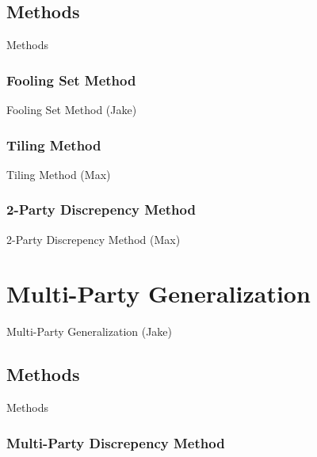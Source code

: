 \documentclass{beamer}
\begin{document}
\subsection{Methods}

\begin{frame}{Methods}
\TODO
\tableofcontents[currentsection]
\end{frame}

\subsubsection{Fooling Set Method}

\begin{frame}{Fooling Set Method (Jake)}
\TODO
\end{frame}

\subsubsection{Tiling Method}

\begin{frame}{Tiling Method (Max)}
\TODO
\end{frame}

\subsubsection{2-Party Discrepency Method}

\begin{frame}{2-Party Discrepency Method (Max)}
\TODO
\end{frame}

\section{Multi-Party Generalization}

\begin{frame}{Multi-Party Generalization (Jake)}
\TODO
\end{frame}

\subsection{Methods}

\begin{frame}{Methods}
\TODO
\tableofcontents[currentsection]
\end{frame}

\subsubsection{Multi-Party Discrepency Method}
\end{document}
